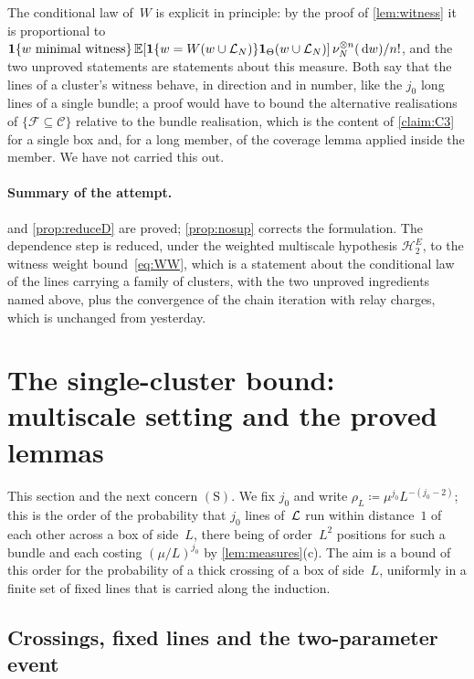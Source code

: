 \documentclass[11pt,letterpaper]{article}
\begin{document}
The conditional law of~$W$ is explicit in principle: by the proof of \cref{lem:witness} it is proportional to $\mathbf{1}\{w\text{ minimal witness}\}\,\mathbb E[\mathbf{1}\{w=W(w\cup\mathcal L_N)\}\mathbf{1}_{\Theta}(w\cup\mathcal L_N)]\,\nu_N^{\otimes n}(\,\mathrm{d} w)/n!$, and the two unproved statements are statements about this measure. Both say that the lines of a cluster's witness behave, in direction and in number, like the $j_0$ long lines of a single bundle; a proof would have to bound the alternative realisations of $\{\mathcal F\subseteq\mathcal C\}$ relative to the bundle realisation, which is the content of \cref{claim:C3} for a single box and, for a long member, of the coverage lemma applied inside the member. We have not carried this out.

\paragraph{Summary of the attempt.}  and \cref{prop:reduceD} are proved; \cref{prop:nosup} corrects the formulation. The dependence step is reduced, under the weighted multiscale hypothesis $\mathcal H^E_2$, to the witness weight bound~\eqref{eq:WW}, which is a statement about the conditional law of the lines carrying a family of clusters, with the two unproved ingredients named above, plus the convergence of the chain iteration with relay charges, which is unchanged from yesterday.

\section{The single-cluster bound: multiscale setting and the proved lemmas}
\label{sec:multiscale}

This section and the next concern $\mathrm{(S)}$. We fix $j_0$ and write $\rho_L\coloneqq\mu^{j_0}L^{-(j_0-2)}$; this is the order of the probability that $j_0$ lines of~$\mathcal L$ run within distance~$1$ of each other across a box of side~$L$, there being of order~$L^2$ positions for such a bundle and each costing $(\mu/L)^{j_0}$ by \cref{lem:measures}(c). The aim is a bound of this order for the probability of a thick crossing of a box of side~$L$, uniformly in a finite set of fixed lines that is carried along the induction.

\subsection{Crossings, fixed lines and the two-parameter event}
\end{document}

